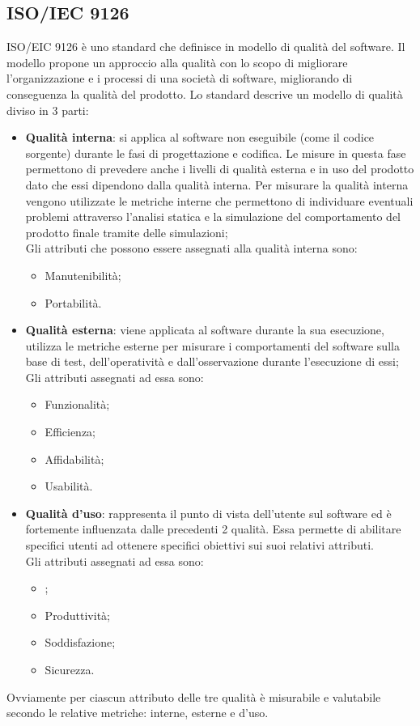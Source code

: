 \documentclass[../piano-di-qualifica.tex]{subfiles}
\begin{document}
\subsection{ISO/IEC 9126}%
\label{sec:iso/iec_9126}
ISO/EIC 9126 è uno standard che definisce in modello di qualità del software. Il modello propone un approccio alla qualità con lo scopo di migliorare l'organizzazione e i processi di una società di software, migliorando di conseguenza la qualità del prodotto.
Lo standard descrive un modello di qualità diviso in 3 parti:
\begin{itemize}
    \item \textbf{Qualità interna}: si applica al software non eseguibile (come il codice sorgente) durante le fasi di progettazione e codifica.
    Le misure in questa fase permettono di prevedere anche i livelli di qualità esterna e in uso del prodotto dato che essi dipendono dalla qualità interna.
    Per misurare la qualità interna vengono utilizzate le metriche interne che permettono di individuare eventuali problemi attraverso l'analisi statica e la simulazione del comportamento del prodotto finale tramite delle simulazioni;
    \\Gli attributi che possono essere assegnati alla qualità interna sono:
    \begin{itemize}
        \item Manutenibilità;
        \item Portabilità.
    \end{itemize}
    \item \textbf{Qualità esterna}: viene applicata al software durante la sua esecuzione, utilizza le metriche esterne per misurare i comportamenti del software sulla base di test, dell'operatività e dall'osservazione durante l'esecuzione di essi;
    \\Gli attributi assegnati ad essa sono:
    \begin{itemize}
        \item Funzionalità;
        \item Efficienza;
        \item Affidabilità;
        \item Usabilità.
    \end{itemize}
    \item \textbf{Qualità d'uso}: rappresenta il punto di vista dell'utente sul software ed è fortemente influenzata dalle precedenti 2 qualità. Essa permette di abilitare specifici utenti ad ottenere specifici obiettivi sui suoi relativi attributi.
    \\Gli attributi assegnati ad essa sono:
    \begin{itemize}
        \item {};
        \item Produttività;
        \item Soddisfazione;
        \item Sicurezza.
    \end{itemize}
\end{itemize}
Ovviamente per ciascun attributo delle tre qualità è misurabile e valutabile secondo le relative metriche: interne, esterne e d'uso.
\end{document}
